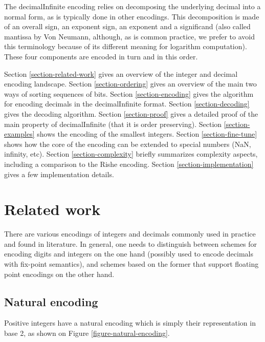 \documentclass{acm_proc_article-sp}
\begin{document}
The decimalInfinite encoding relies on decomposing the underlying decimal into a normal form, as is typically done in other encodings. This decomposition is made of an overall sign, an exponent sign, an exponent and a significand (also called mantissa by Von Neumann, although, as is common practice, we prefer to avoid this terminology because of its different meaning for logarithm computation). These four components are encoded in turn and in this order.

Section \ref{section-related-work} gives an overview of the integer and decimal encoding landscape.
Section \ref{section-ordering} gives an overview of the main two ways of sorting sequences of bits.
Section \ref{section-encoding} gives the algorithm for encoding decimals in the decimalInfinite format.
Section \ref{section-decoding} gives the decoding algorithm.
Section \ref{section-proof} gives a detailed proof of the main property of decimalInfinite (that it is order preserving).
Section \ref{section-examples} shows the encoding of the smallest integers.
Section \ref{section-fine-tune} shows how the core of the encoding can be extended to special numbers (NaN, infinity, etc).
Section \ref{section-complexity} briefly summarizes complexity aspects, including a comparison to the Rishe encoding.
Section \ref{section-implementation} gives a few implementation details.

\section{Related work}

There are various encodings of integers and decimals commonly used in practice and found in literature. In general, one needs to distinguish between schemes for encoding digits and integers on the one hand (possibly used to encode decimals with fix-point semantics), and schemes based on the former that support floating point encodings on the other hand.

\label{section-related-work}

\subsection{Natural encoding}

Positive integers have a natural encoding which is simply their representation in base 2, as shown on Figure \ref{figure-natural-encoding}.
\end{document}
